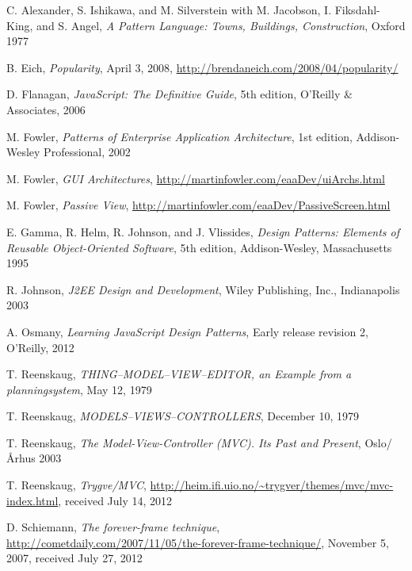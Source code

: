 \begin{thebibliography}{------}


C. Alexander, S. Ishikawa, and M. Silverstein with M. Jacobson, I. Fiksdahl-King, and S. Angel, \emph{A Pattern Language: Towns, Buildings, Construction}, Oxford 1977 %

B. Eich, \emph{Popularity}, April 3, 2008, \url{http://brendaneich.com/2008/04/popularity/}

D. Flanagan, \emph{JavaScript: The Definitive Guide}, 5th edition, O'Reilly \& Associates, 2006

M. Fowler, \emph{Patterns of Enterprise Application Architecture}, 1st edition, Addison-Wesley Professional, 2002 %

M. Fowler, \emph{GUI Architectures}, \url{http://martinfowler.com/eaaDev/uiArchs.html}

M. Fowler, \emph{Passive View}, \url{http://martinfowler.com/eaaDev/PassiveScreen.html}

E. Gamma, R. Helm, R. Johnson, and J. Vlissides, \emph{Design Patterns: Elements of Reusable Object-Oriented Software}, 5th edition, Addison-Wesley, Massachusetts 1995

R. Johnson, \emph{J2EE Design and Development}, Wiley Publishing, Inc., Indianapolis 2003

A. Osmany, \emph{Learning JavaScript Design Patterns}, Early release revision 2, O'Reilly, 2012

T. Reenskaug, \emph{THING--MODEL--VIEW--EDITOR, an Example from a planningsystem}, May 12, 1979

T. Reenskaug, \emph{MODELS--VIEWS--CONTROLLERS}, December 10, 1979

T. Reenskaug, \emph{The Model-View-Controller (MVC). Its Past and Present}, Oslo/Århus 2003

T. Reenskaug, \emph{Trygve/MVC}, \url{http://heim.ifi.uio.no/~trygver/themes/mvc/mvc-index.html}, received July 14, 2012

D. Schiemann, \emph{The forever-frame technique}, \url{http://cometdaily.com/2007/11/05/the-forever-frame-technique/}, November 5, 2007, received July 27, 2012


\end{thebibliography}
